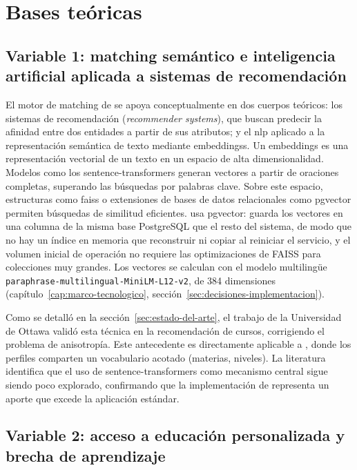\section{Bases teóricas}\label{sec:bases-teoricas}

\subsection{Variable 1: matching semántico e inteligencia artificial
aplicada a sistemas de recomendación}\label{sec:variable1}

El motor de \gls{matching} de \sistema{} se apoya conceptualmente en dos
cuerpos teóricos: los sistemas de recomendación (\emph{recommender
systems}), que buscan predecir la afinidad entre dos entidades a partir
de sus atributos; y el \gls{nlp}
aplicado a la representación semántica de texto mediante
\glspl{embeddings}. Un \gls{embeddings} es una representación vectorial de
un texto en un espacio de alta dimensionalidad. Modelos como los
sentence-transformers generan vectores a partir de oraciones completas,
superando las búsquedas por palabras clave. Sobre este espacio,
estructuras como \gls{faiss} o extensiones de
bases de datos relacionales como pgvector permiten búsquedas de similitud
eficientes. \sistema{} usa pgvector: guarda los vectores en una columna
de la misma base PostgreSQL que el resto del sistema, de modo que no hay
un índice en memoria que reconstruir ni copiar al reiniciar el servicio,
y el volumen inicial de operación no requiere las optimizaciones de FAISS para
colecciones muy grandes. Los vectores se calculan con el modelo
multilingüe \texttt{paraphrase-}\allowbreak\texttt{multilingual-}\allowbreak\texttt{MiniLM-L12-v2}, de 384
dimensiones (capítulo~\ref{cap:marco-tecnologico},
sección~\ref{sec:decisiones-implementacion}).

Como se detalló en la sección~\ref{sec:estado-del-arte}, el trabajo de
la Universidad de Ottawa \citep{isotropy2026} validó esta técnica en la
recomendación de cursos, corrigiendo el problema de anisotropía. Este
antecedente es directamente aplicable a \sistema{}, donde los perfiles
comparten un vocabulario acotado (materias, niveles). La literatura
\citep{beefore2024} identifica que el uso de sentence-transformers como
mecanismo central sigue siendo poco explorado, confirmando que la
implementación de \sistema{} representa un aporte que excede la
aplicación estándar.

\subsection{Variable 2: acceso a educación personalizada y brecha de
aprendizaje}\label{sec:variable2}


